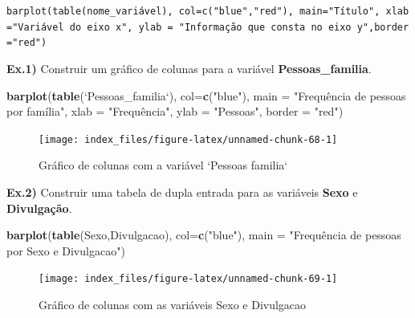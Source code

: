 \documentclass[12pt,brazil,oneside]{book}
\newenvironment{Shaded}{\begin{snugshade}}{\end{snugshade}}
\newcommand{\DataTypeTok}[1]{\textcolor[rgb]{0.13,0.29,0.53}{#1}}
\newcommand{\KeywordTok}[1]{\textcolor[rgb]{0.13,0.29,0.53}{\textbf{#1}}}
\newcommand{\NormalTok}[1]{#1}
\newcommand{\StringTok}[1]{\textcolor[rgb]{0.31,0.60,0.02}{#1}}
\begin{document}
\texttt{barplot(table(nome\_variável),\ col=c("blue","red"),\ main="Título",\ xlab="Variável\ do\ eixo\ x",\ ylab\ =\ "Informação\ que\ consta\ no\ eixo\ y",border="red")}

\textbf{Ex.1)} Construir um gráfico de colunas para a variável
\textbf{Pessoas\_familia}.

\begin{Shaded}
\begin{Highlighting}[]
\KeywordTok{barplot}\NormalTok{(}\KeywordTok{table}\NormalTok{(}\StringTok{`}\DataTypeTok{Pessoas_familia}\StringTok{`}\NormalTok{), }\DataTypeTok{col=}\KeywordTok{c}\NormalTok{(}\StringTok{"blue"}\NormalTok{), }
        \DataTypeTok{main =} \StringTok{"Frequência de pessoas por família"}\NormalTok{, }
        \DataTypeTok{xlab =} \StringTok{"Frequência", }
\StringTok{        ylab = "}\NormalTok{Pessoas}\StringTok{", }
\StringTok{        border = "}\NormalTok{red}\StringTok{")}
\end{Highlighting}
\end{Shaded}

\begin{figure}[H]

{\centering \texttt{[image: index\_files/figure-latex/unnamed-chunk-68-1]} 

}

\caption{Gráfico de colunas com a variável `Pessoas familia`}\label{fig:unnamed-chunk-68}
\end{figure}

\textbf{Ex.2)} Construir uma tabela de dupla entrada para as variáveis
\textbf{Sexo} e \textbf{Divulgação}.

\begin{Shaded}
\begin{Highlighting}[]
\KeywordTok{barplot}\NormalTok{(}\KeywordTok{table}\NormalTok{(Sexo,Divulgacao), }
        \DataTypeTok{col=}\KeywordTok{c}\NormalTok{(}\StringTok{"blue"}\NormalTok{), }
        \DataTypeTok{main =} \StringTok{"Frequência de pessoas por Sexo e Divulgacao"}\NormalTok{)}
\end{Highlighting}
\end{Shaded}

\begin{figure}[H]

{\centering \texttt{[image: index\_files/figure-latex/unnamed-chunk-69-1]} 

}

\caption{Gráfico de colunas com as variáveis Sexo e Divulgacao}\label{fig:unnamed-chunk-69}
\end{figure}
\end{document}
